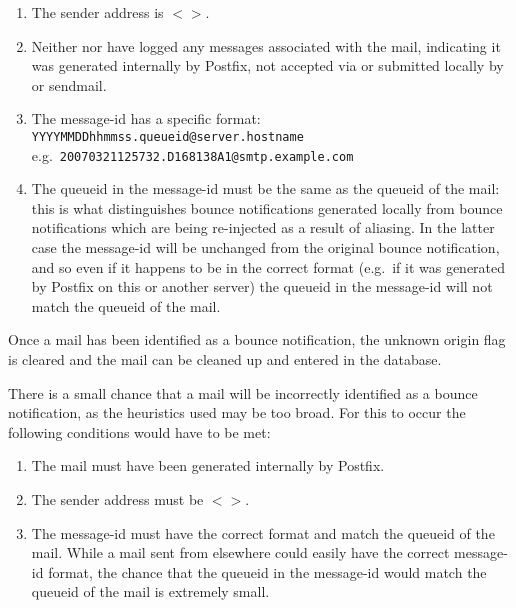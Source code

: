 \begin{enumerate}

    \item The sender address is $<>$.

    \item Neither  nor  have logged any
        messages associated with the mail, indicating it was generated
        internally by Postfix, not accepted via \SMTP{} or submitted
        locally by  or sendmail.

    \item The message-id has a specific format: \newline
        \texttt{YYYYMMDDhhmmss.queueid@server.hostname} \newline
        e.g.\ \texttt{20070321125732.D168138A1@smtp.example.com}

    \item The queueid in the message-id must be the same as the queueid of
        the mail: this is what distinguishes bounce notifications generated
        locally from bounce notifications which are being re-injected as a
        result of aliasing.  In the latter case the message-id will be
        unchanged from the original bounce notification, and so even if it
        happens to be in the correct format (e.g.\ if it was generated by
        Postfix on this or another server) the queueid in the message-id
        will not match the queueid of the mail.

\end{enumerate}

Once a mail has been identified as a bounce notification, the unknown
origin flag is cleared and the mail can be cleaned up and entered in the
database.

There is a small chance that a mail will be incorrectly identified as a
bounce notification, as the heuristics used may be too broad.  For this to
occur the following conditions would have to be met:

\begin{enumerate}

    \item The mail must have been generated internally by Postfix.

    \item The sender address must be $<>$.

    \item The message-id must have the correct format and match the queueid
        of the mail.  While a mail sent from elsewhere could easily have
        the correct message-id format, the chance that the queueid in the
        message-id would match the queueid of the mail is extremely small.

\end{enumerate}

